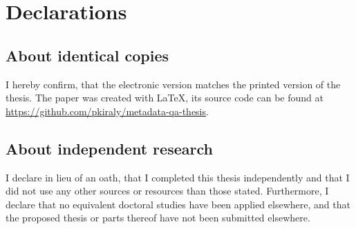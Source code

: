 \chapter{Declarations}

\section{About identical copies}

I hereby confirm, that the electronic version matches the printed version of the thesis. The paper was created with \LaTeX, its source code can be found at \url{https://github.com/pkiraly/metadata-qa-thesis}.

\section{About independent research}

I declare in lieu of an oath, that I completed this thesis independently and that I did not use any other sources or resources than those stated. Furthermore, I declare that no equivalent doctoral studies have been applied elsewhere, and that the proposed thesis or parts thereof have not been submitted elsewhere.
